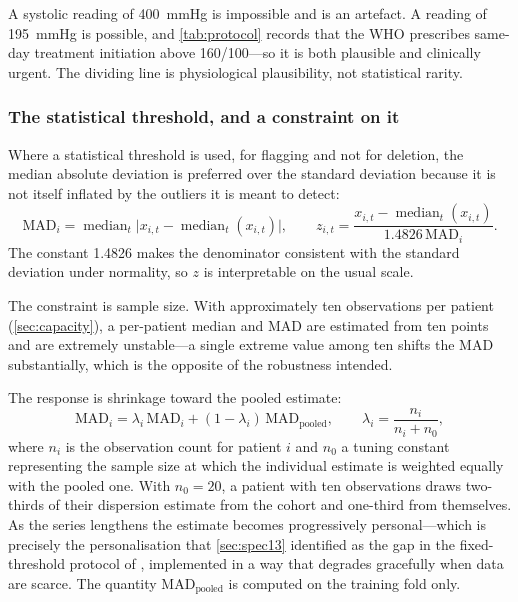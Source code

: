 \documentclass[12pt,a4paper,oneside]{report}
\begin{document}
A systolic reading of 400~mmHg is impossible and is an artefact. A reading of 195~mmHg is possible, and \cref{tab:protocol} records that the WHO prescribes same-day treatment initiation above 160/100---so it is both plausible and clinically urgent. The dividing line is physiological plausibility, not statistical rarity.

\subsubsection{The statistical threshold, and a constraint on it}\label{sec:mad-shrinkage}

Where a statistical threshold is used, for flagging and not for deletion, the median absolute deviation is preferred over the standard deviation because it is not itself inflated by the outliers it is meant to detect:
\begin{equation}
  \mathrm{MAD}_i = \operatorname{median}_t \bigl\lvert x_{i,t} - \operatorname{median}_t(x_{i,t}) \bigr\rvert,
  \qquad
  z_{i,t} = \frac{x_{i,t} - \operatorname{median}_t(x_{i,t})}{1.4826\,\mathrm{MAD}_i}.
\end{equation}
The constant 1.4826 makes the denominator consistent with the standard deviation under normality, so $z$ is interpretable on the usual scale.

The constraint is sample size. With approximately ten observations per patient (\cref{sec:capacity}), a per-patient median and MAD are estimated from ten points and are extremely unstable---a single extreme value among ten shifts the MAD substantially, which is the opposite of the robustness intended.

The response is shrinkage toward the pooled estimate:
\begin{equation}
  \widehat{\mathrm{MAD}}_i = \lambda_i\,\mathrm{MAD}_i + (1-\lambda_i)\,\mathrm{MAD}_{\text{pooled}},
  \qquad
  \lambda_i = \frac{n_i}{n_i + n_0},
\end{equation}
where $n_i$ is the observation count for patient $i$ and $n_0$ a tuning constant representing the sample size at which the individual estimate is weighted equally with the pooled one. With $n_0 = 20$, a patient with ten observations draws two-thirds of their dispersion estimate from the cohort and one-third from themselves. As the series lengthens the estimate becomes progressively personal---which is precisely the personalisation that \cref{sec:spec13} identified as the gap in the fixed-threshold protocol of \textcite{mihevc2025}, implemented in a way that degrades gracefully when data are scarce. The quantity $\mathrm{MAD}_{\text{pooled}}$ is computed on the training fold only.
\end{document}
